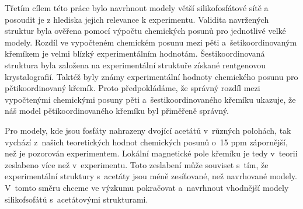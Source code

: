 \documentclass[
digital, %
table,   %
nolof,     %
nolot,     %
oneside,
]{fithesis3}
\begin{document}
Třetím cílem této práce bylo navrhnout modely větší silikofosfátové sítě a posoudit je z hlediska jejich relevance k experimentu. Validita navržených struktur byla ověřena pomocí výpočtu chemických posunů pro jednotlivé velké modely. Rozdíl ve vypočteném chemickém posunu mezi pěti a~šetikoordinovaným křemíkem je velmi blízký experimentálním hodnotám.  Šestikoordinovaná struktura byla založena na experimentální struktuře získané rentgenovou krystalografií. Taktéž byly známy experimentální hodnoty chemického posunu pro pětikoordinovaný křemík. Proto předpokládáme, že správný rozdíl mezi vypočtenými chemickými posuny pěti a~šestikoordinovaného křemíku ukazuje, že náš model pětikoordinovaného křemíku byl přiměřeně správný.

Pro modely, kde jsou fosfáty nahrazeny dvojící acetátů v~různých polohách, tak vychází z~našich teoretických hodnot chemických posunů o~15 ppm zápornější, než je pozorován experimentem. Lokální magnetické pole křemíku je tedy v~teorii zeslabeno více než v~experimentu. Toto zeslabení může souviset s~tím, že experimentální struktury s~acetáty jsou méně zesíťované, než navrhované modely. V~tomto směru chceme ve výzkumu pokračovat a~navrhnout vhodnější modely silikofsofátů s~acetátovými strukturami.




\newpage


\appendix %
\end{document}
